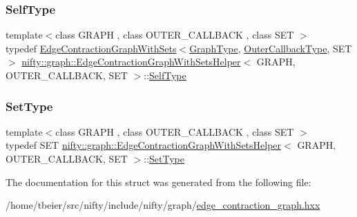 \mbox{\label{structnifty_1_1graph_1_1EdgeContractionGraphWithSetsHelper_a7b0578f3509ed396dd72b029e4e8b105}} 
\subsubsection{\texorpdfstring{Self\+Type}{SelfType}}
{\footnotesize\ttfamily template$<$class G\+R\+A\+PH , class O\+U\+T\+E\+R\+\_\+\+C\+A\+L\+L\+B\+A\+CK , class S\+ET $>$ \\
typedef \hyperlink{classnifty_1_1graph_1_1EdgeContractionGraphWithSets}{Edge\+Contraction\+Graph\+With\+Sets}$<$\hyperlink{structnifty_1_1graph_1_1EdgeContractionGraphWithSetsHelper_a7f5226bf25f277d906a526db55556cdf}{Graph\+Type}, \hyperlink{structnifty_1_1graph_1_1EdgeContractionGraphWithSetsHelper_a3e0b97cbc8de91c57e3dc83860edda69}{Outer\+Callback\+Type}, S\+ET$>$ \hyperlink{structnifty_1_1graph_1_1EdgeContractionGraphWithSetsHelper}{nifty\+::graph\+::\+Edge\+Contraction\+Graph\+With\+Sets\+Helper}$<$ G\+R\+A\+PH, O\+U\+T\+E\+R\+\_\+\+C\+A\+L\+L\+B\+A\+CK, S\+ET $>$\+::\hyperlink{structnifty_1_1graph_1_1EdgeContractionGraphWithSetsHelper_a7b0578f3509ed396dd72b029e4e8b105}{Self\+Type}}

\mbox{\label{structnifty_1_1graph_1_1EdgeContractionGraphWithSetsHelper_acc1b924a2b02648491b614c8d69ca9fb}} 
\subsubsection{\texorpdfstring{Set\+Type}{SetType}}
{\footnotesize\ttfamily template$<$class G\+R\+A\+PH , class O\+U\+T\+E\+R\+\_\+\+C\+A\+L\+L\+B\+A\+CK , class S\+ET $>$ \\
typedef S\+ET \hyperlink{structnifty_1_1graph_1_1EdgeContractionGraphWithSetsHelper}{nifty\+::graph\+::\+Edge\+Contraction\+Graph\+With\+Sets\+Helper}$<$ G\+R\+A\+PH, O\+U\+T\+E\+R\+\_\+\+C\+A\+L\+L\+B\+A\+CK, S\+ET $>$\+::\hyperlink{structnifty_1_1graph_1_1EdgeContractionGraphWithSetsHelper_acc1b924a2b02648491b614c8d69ca9fb}{Set\+Type}}



The documentation for this struct was generated from the following file\+:\begin{DoxyCompactItemize}
\item 
/home/tbeier/src/nifty/include/nifty/graph/\hyperlink{graph_2edge__contraction__graph_8hxx}{edge\+\_\+contraction\+\_\+graph.\+hxx}\end{DoxyCompactItemize}
